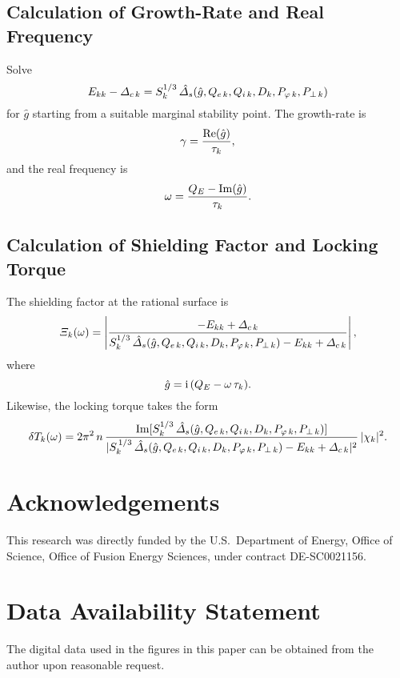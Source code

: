 \documentclass[12pt,prb,aps,notitlepage]{revtex4-1}
\begin{document}
\subsection{Calculation of Growth-Rate and Real Frequency}
Solve
\begin{equation}
E_{kk} - {\mit\Delta}_{c\,k} = S^{1/3}_k\,\hat{\mit\Delta}_s(\hat{g}, Q_{e\,k},Q_{i\,k},D_k,P_{\varphi\,k},P_{\perp\,k})
\end{equation}
for $\hat{g}$ starting from a suitable marginal stability point. 
The growth-rate is
\begin{equation}
\gamma =\frac{{\rm Re}(\hat{g})}{\tau_k},
\end{equation}
and the real frequency is
\begin{equation}
\omega = \frac{Q_E-{\rm Im}(\hat{g})}{\tau_k}.
\end{equation}

\subsection{Calculation of Shielding Factor and Locking Torque}
The shielding factor at the rational surface is
\begin{equation}
{\mit\Xi}_k(\omega) = \left|\frac{-E_{kk} +{\mit\Delta}_{c\,k}}{S_k^{1/3}\,\hat{\mit\Delta}_s(\hat{g}, Q_{e\,k},Q_{i\,k},D_k,P_{\varphi\,k},P_{\perp\,k})-E_{kk}+
{\mit\Delta}_{c\,k}}\right|,
\end{equation}
where
\begin{equation}
\hat{g} = {\rm i}\,(Q_E-\omega\,\tau_k).
\end{equation}
Likewise, the locking torque takes the form
\begin{equation}
\delta T_k(\omega) = 2\pi^2\,n \,\frac{{\rm Im}[S_k^{1/3}\,\hat{\mit\Delta}_s(\hat{g}, Q_{e\,k},Q_{i\,k},D_k,P_{\varphi\,k},P_{\perp\,k})]}{
|S_k^{\,1/3}\,\hat{\mit\Delta}_s(\hat{g}, Q_{e\,k},Q_{i\,k},D_k,P_{\varphi\,k},P_{\perp\,k})-E_{kk}+{\mit\Delta}_{c\,k}|^2}\,|\chi_k|^2.
\end{equation}


\section*{Acknowledgements}
This research was directly funded by the U.S.\ Department of Energy,  Office of Science, Office of Fusion Energy Sciences, under  contract DE-SC0021156. 

\section*{Data Availability Statement}
The digital data used in the figures in this paper can be obtained from the author upon reasonable request.
\end{document}
